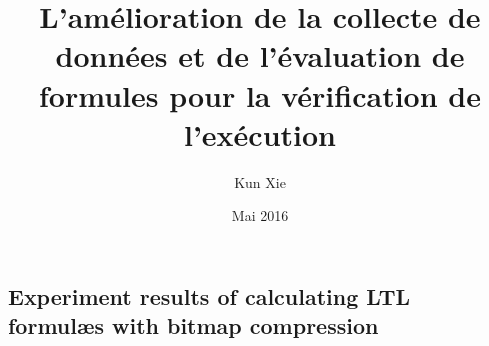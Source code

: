 \documentclass[times,twoside,memoire]{uqac-these}
\theoremstyle{definition}
\newcommand{\UqacTheseTitre}{L'amélioration de la collecte de données et de l'évaluation de formules pour la vérification de l'exécution}
\newcommand{\UqacTheseAuteur}{Kun Xie}
\newcommand{\UqacTheseDate}{Mai 2016}
\begin{document}
  
\title{\UqacTheseTitre}
\author{\UqacTheseAuteur}
\date{\UqacTheseDate}
\thispagestyle{empty}
\maketitle

\frontmatter

\doublespacing




\singlespacing
\cleardoublepage
\pdfbookmark{\contentsname}{\contentsname}
\label{\contentsname}
\tableofcontents
\newpage

\label{\listfigurename}
\listoffigures
\newpage

\label{\listtablename}
\listoftables
\newpage

\mainmatter
\doublespacing







% 

\begin{appendices}
\chapter{Experiment results of calculating LTL formul\ae{}s with bitmap compression}
\label{appendixa}

\end{appendices}

\backmatter
% 

\clearpage
{}



\end{document}

